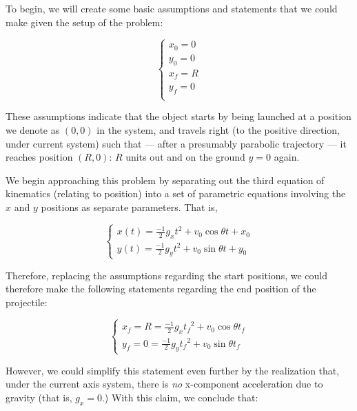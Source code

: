 \documentclass[letterpaper]{article}
\begin{document}
To begin, we will create some basic assumptions and statements that we could make given the setup of the problem:

\begin{equation}
    \begin{cases}
        x_0 = 0 \\
        y_0 = 0 \\
        x_f = R \\
        y_f = 0 \\
    \end{cases}
\end{equation}

These assumptions indicate that the object starts by being launched at a position we denote as \((0,0)\) in the system, and travels right (to the positive direction, under current system) such that --- after a presumably parabolic trajectory --- it reaches position \((R,0)\): \(R\) units out and on the ground \(y=0\) again.

We begin approaching this problem by separating out the third equation of kinematics (relating to position) into a set of parametric equations involving the \(x\) and \(y\) positions as separate parameters. That is,

\begin{equation}
    \begin{cases}
        x(t) = \frac{-1}{2}g_xt^2 + v_0\cos\theta t + x_0 \\
        y(t) = \frac{-1}{2}g_yt^2 + v_0\sin\theta t + y_0 
    \end{cases}
\end{equation}

Therefore, replacing the assumptions regarding the start positions, we could therefore make the following statements regarding the end position of the projectile:

\begin{equation}
    \begin{cases}
        x_f = R = \frac{-1}{2}g_x{t_f}^2 + v_0\cos\theta t_f \\
        y_f = 0 = \frac{-1}{2}g_y{t_f}^2 + v_0\sin\theta t_f
    \end{cases}
\end{equation}

However, we could simplify this statement even further by the realization that, under the current axis system, there is \emph{no} x-component acceleration due to gravity (that is, \(g_x = 0\).) With this claim, we conclude that:
\end{document}
